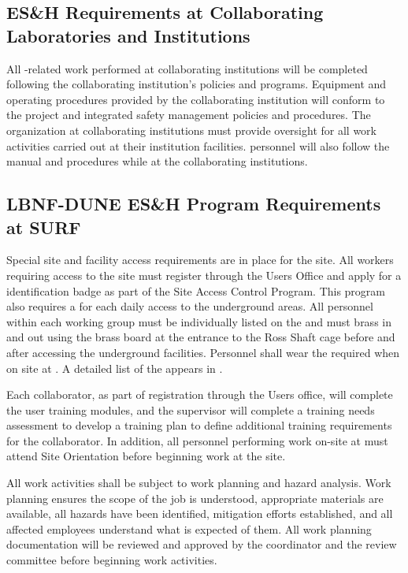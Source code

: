 \subsection{ES\&H Requirements at Collaborating Laboratories and Institutions}

All -related work performed at collaborating institutions will be completed
following the collaborating institution's  policies and
programs. Equipment and operating procedures provided by the
collaborating institution will conform to the  project
 and integrated safety management policies and
procedures. The  organization at collaborating institutions
must provide  oversight for all work activities carried
out at their institution facilities. 
personnel will also follow the  manual and procedures while at
the collaborating institutions.

\subsection{LBNF-DUNE ES\&H Program Requirements at SURF}

Special site and facility access requirements are in place for the  site. All  workers requiring access to the  site must
register through the \fnal Users Office and apply for
a  identification badge as part of
the  Site Access Control Program.
This program also requires a  for each daily access to the
underground areas.  All personnel within each working group must be
individually listed on the  and must brass in and
out using the brass board at the entrance to the Ross Shaft
cage before and after accessing the underground facilities. Personnel shall wear the required  when on site at . 
A detailed list of the  appears in \tcchesh. 


Each  collaborator, as part of registration through the \fnal Users office,
will complete the user  training modules, and the supervisor
will complete a training needs assessment to develop a training plan
to define additional   training requirements for the collaborator.
In addition, all personnel performing work on-site at  must
attend   Site Orientation before beginning work at the site.


All work activities
shall be subject to work planning and hazard analysis. 
Work planning ensures the scope of
the job is understood, appropriate materials are available, all
hazards have been identified, mitigation efforts established, and all
affected employees understand what is expected of them.   
All work planning documentation will be reviewed and
approved by the   coordinator and the 
 review committee before beginning work activities.

